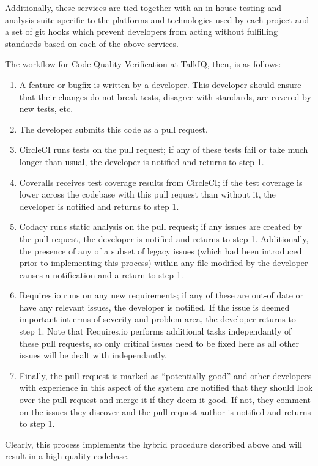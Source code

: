 \documentclass[12pt]{article}
\begin{document}
Additionally, these services are tied together with an in-house testing and analysis suite specific to the platforms and technologies used by each project and a set of git hooks which prevent developers from acting without fulfilling standards based on each of the above services.

The workflow for Code Quality Verification at TalkIQ, then, is as follows:
\begin{enumerate}
\item A feature or bugfix is written by a developer. This developer should ensure that their changes do not break tests, disagree with standards, are covered by new tests, etc.
\item The developer submits this code as a pull request.
\item CircleCI runs tests on the pull request; if any of these tests fail or take much longer than usual, the developer is notified and returns to step 1.
\item Coveralls receives test coverage results from CircleCI; if the test coverage is lower across the codebase with this pull request than without it, the developer is notified and returns to step 1.
\item Codacy runs static analysis on the pull request; if any issues are created by the pull request, the developer is notified and returns to step 1. Additionally, the presence of any of a subset of legacy issues (which had been introduced prior to implementing this process) within any file modified by the developer causes a notification and a return to step 1.
\item Requires.io runs on any new requirements; if any of these are out-of date or have any relevant issues, the developer is notified. If the issue is deemed important int erms of severity and problem area, the developer returns to step 1. Note that Requires.io performs additional tasks independantly of these pull requests, so only critical issues need to be fixed here as all other issues will be dealt with independantly.
\item Finally, the pull request is marked as ``potentially good'' and other developers with experience in this aspect of the system are notified that they should look over the pull request and merge it if they deem it good. If not, they comment on the issues they discover and the pull request author is notified and returns to step 1.
\end{enumerate}

Clearly, this process implements the hybrid procedure described above and will result in a high-quality codebase.
\end{document}
